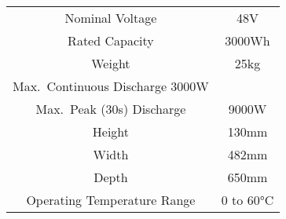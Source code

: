 \begin{tabular}{cc}
\toprule
Nominal Voltage & 48V \\
Rated Capacity & 3000Wh \\
Weight & 25kg \\
Max.\ Continuous Discharge 3000W \\
Max.\ Peak (30s) Discharge  & 9000W \\
Height & 130mm \\
Width & 482mm \\
Depth & 650mm \\
Operating Temperature Range & 0 to 60\si{\celsius} \\
\bottomrule
\end{tabular}
